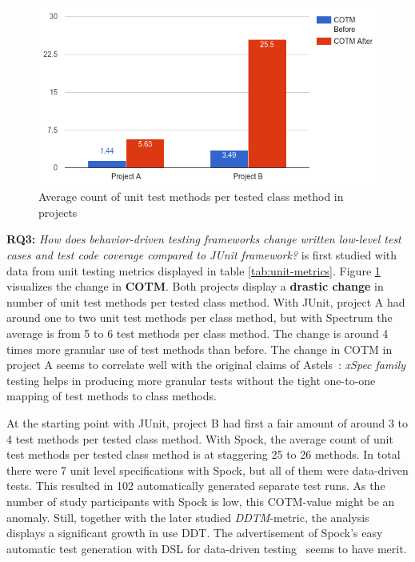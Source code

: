 \begin{figure}[ht]
  \begin{center}
    \includegraphics[width=12.7cm]{images/COTM.png}
    \caption{Average count of unit test methods per tested class method in projects}
    \label{fig:cotm}
  \end{center}
\end{figure}

\textbf{RQ3: }\textit{How does behavior-driven testing frameworks change written low-level test cases and test code coverage compared to JUnit framework?}
is first studied with data from unit testing metrics displayed in table \ref{tab:unit-metrics}. Figure \ref{fig:cotm} visualizes
the change in \textbf{COTM}. Both projects display a \textbf{drastic change} in number of unit test methods per tested class method. With JUnit, project A
had around one to two unit test methods per class method, but with Spectrum the average is from 5 to 6 test methods per class method. The
change is around 4 times more granular use of test methods than before. The change in COTM in project A seems to correlate well with the original
claims of Astels~\cite{astels2006new}: \textit{xSpec family} testing helps in producing more granular tests without the tight one-to-one mapping of test methods
to class methods.

At the starting point with JUnit, project B had first a fair amount of around 3 to 4
test methods per tested class method. With Spock, the average count of unit test methods per tested
class method is at staggering 25 to 26 methods. In total there were 7 unit level specifications with Spock, but all of them were
data-driven tests. This resulted in 102 automatically generated separate test runs. As the number of study participants with Spock is low, this COTM-value might
be an anomaly. Still, together with the later studied \textit{DDTM}-metric, the analysis displays
a significant growth in use DDT. The advertisement of Spock's easy automatic test generation with DSL for data-driven testing~\cite{kapelonis2016java}
seems to have merit.

